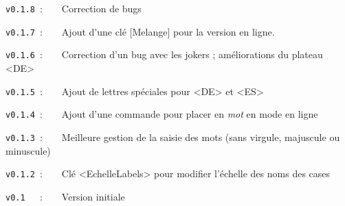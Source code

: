 \documentclass{article}
\begin{document}
\verb|v0.1.8|~:~~~~Correction de bugs

\verb|v0.1.7|~:~~~~Ajout d'une clé \textsf{[Melange]} pour la version en ligne.

\verb|v0.1.6|~:~~~~Correction d'un bug avec les jokers ; améliorations du plateau \textsf{<DE>}

\verb|v0.1.5|~:~~~~Ajout de lettres spéciales pour \textsf{<DE>} et \textsf{<ES>}

\verb|v0.1.4|~:~~~~Ajout d'une commande pour placer en \textit{mot} en mode \og en ligne \fg

\verb|v0.1.3|~:~~~~Meilleure gestion de la saisie des mots (sans virgule, majuscule ou minuscule)

\verb|v0.1.2|~:~~~~Clé \textsf{<EchelleLabels>} pour modifier l'échelle des noms des cases

\verb|v0.1  |~:~~~~Version initiale
\end{document}
